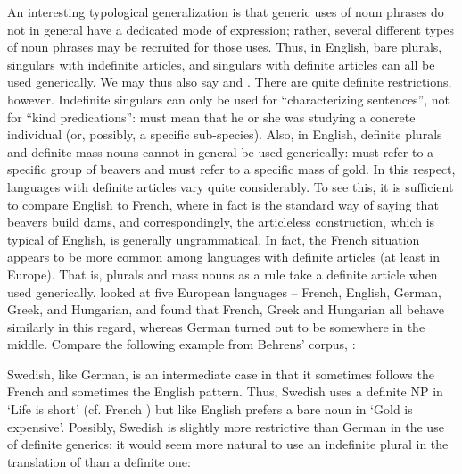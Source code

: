 An interesting typological generalization is that generic uses of noun phrases do not in general have a dedicated mode of expression; rather, several different types of noun phrases may be recruited for those uses. Thus, in English, bare plurals, singulars with indefinite articles, and singulars with definite articles can all be used generically. We may thus also say  and . There are quite definite restrictions, however. Indefinite singulars can only be used for “characterizing sentences”, not for “kind predications”: must mean that he or she was studying a concrete individual (or, possibly, a specific sub-species). Also, in English, definite plurals and definite mass nouns cannot in\textbf{ }general be used generically:  must refer to a specific group of beavers and  must refer to a specific mass of gold. In this respect, languages with definite articles vary quite considerably. To see this, it is sufficient to compare English to French, where in fact  is the standard way of saying that beavers build dams, and correspondingly, the articleless construction, which is typical of English, is generally ungrammatical. In fact, the French situation appears to be more common among languages with definite articles (at least in Europe). That is, plurals and mass nouns as a rule take a definite article when used generically. \citet{Behrens2005} looked at five European languages – French, English, German, Greek, and Hungarian, and found that French, Greek and Hungarian all behave similarly in this regard, whereas German turned out to be somewhere in the middle. Compare the following example from Behrens’ corpus, :

\ea
	\z 
\z



Swedish, like German, is an intermediate case in that it sometimes follows the French and sometimes the English pattern. Thus, Swedish uses a definite NP in  ‘Life is short’ (cf. French ) but like English prefers a bare noun in  ‘Gold is expensive’. Possibly, Swedish is slightly more restrictive than German in the use of definite generics: it would seem more natural to use an indefinite plural in the translation of  than a definite one:


